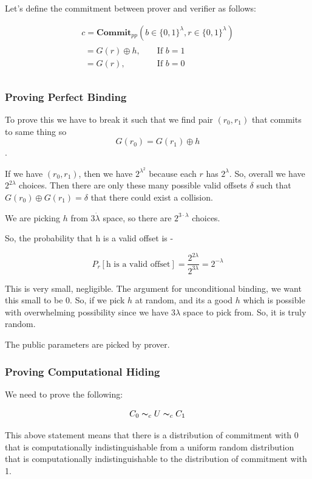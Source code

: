 \documentclass{article}
\begin{document}
Let's define the commitment between prover and verifier as follows:

\begin{align*}
    c = \mathbf{Commit}_{pp}(b \in \{0,1\}^{\lambda}, r \in \{0,1\}^{\lambda}) \\
    \begin{matrix}
        = G(r) \oplus h, && \text{ If } b = 1 \\
        = G(r), && \text{ If } b = 0 \\
    \end{matrix}
\end{align*}

\subsubsection{Proving Perfect Binding}

To prove this we have to break it such that we find pair $(r_0, r_1)$ that commits to same thing so $$G(r_0) = G(r_1) \oplus h$$.

If we have $(r_0, r_1)$, then we have $2^{\lambda^{2}}$  because each $r$ has $2^\lambda$. So, overall we have $2^{2\lambda}$ choices. Then there are only these many possible valid offsets $\delta$ such that $G(r_0) \oplus G(r_1) = \delta$ that there could exist a collision.

We are picking $h$ from $3 \dot \lambda$ space, so there are $2^{3\cdot \lambda}$ choices.

So, the probability that h is a valid offset is -

$$
P_r[\text{h is a valid offset}] = \frac{2^{2\lambda}}{2^{3\lambda}} = 2^{-\lambda} 
$$

This is very small, negligible. The argument for unconditional binding, we want this small to be $0$. So, if we pick $h$ at random, and its a good $h$ which is possible with overwhelming possibility since we have $3\lambda$ space to pick from. So, it is truly random.

The public parameters are picked by prover.

\subsubsection{Proving Computational Hiding}

We need to prove the following:

$$C_0 \thicksim_c U \thicksim_c C_1$$

This above statement means that there is a distribution of commitment with 0 that is computationally indistinguishable from a uniform random distribution that is computationally indistinguishable to the distribution of commitment with 1.
\end{document}
